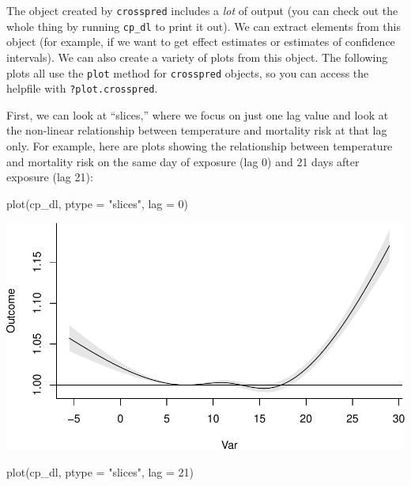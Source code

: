 \documentclass[
]{book}
\newenvironment{Shaded}{\begin{snugshade}}{\end{snugshade}}
\newcommand{\AttributeTok}[1]{\textcolor[rgb]{0.77,0.63,0.00}{#1}}
\newcommand{\DecValTok}[1]{\textcolor[rgb]{0.00,0.00,0.81}{#1}}
\newcommand{\FunctionTok}[1]{\textcolor[rgb]{0.00,0.00,0.00}{#1}}
\newcommand{\NormalTok}[1]{#1}
\newcommand{\StringTok}[1]{\textcolor[rgb]{0.31,0.60,0.02}{#1}}
\begin{document}
The object created by \texttt{crosspred} includes a \emph{lot} of output (you can check out the
whole thing by running \texttt{cp\_dl} to print it out). We can extract elements from this object
(for example, if we want to get effect estimates or estimates of confidence intervals).
We can also create a variety of plots from this object. The following plots all use the
\texttt{plot} method for \texttt{crosspred} objects, so you can access the helpfile with \texttt{?plot.crosspred}.

First, we can look at ``slices,'' where we focus on just one lag value and look at the non-linear relationship between temperature and mortality risk at that lag only. For example, here are plots showing the relationship between temperature and mortality risk on the same day of exposure (lag 0) and 21 days after exposure (lag 21):

\begin{Shaded}
\begin{Highlighting}[]
\FunctionTok{plot}\NormalTok{(cp\_dl, }\AttributeTok{ptype =} \StringTok{"slices"}\NormalTok{, }\AttributeTok{lag =} \DecValTok{0}\NormalTok{)}
\end{Highlighting}
\end{Shaded}

\includegraphics{adv_epi_analysis_files/figure-latex/unnamed-chunk-105-1.pdf}

\begin{Shaded}
\begin{Highlighting}[]
\FunctionTok{plot}\NormalTok{(cp\_dl, }\AttributeTok{ptype =} \StringTok{"slices"}\NormalTok{, }\AttributeTok{lag =} \DecValTok{21}\NormalTok{)}
\end{Highlighting}
\end{Shaded}
\end{document}
